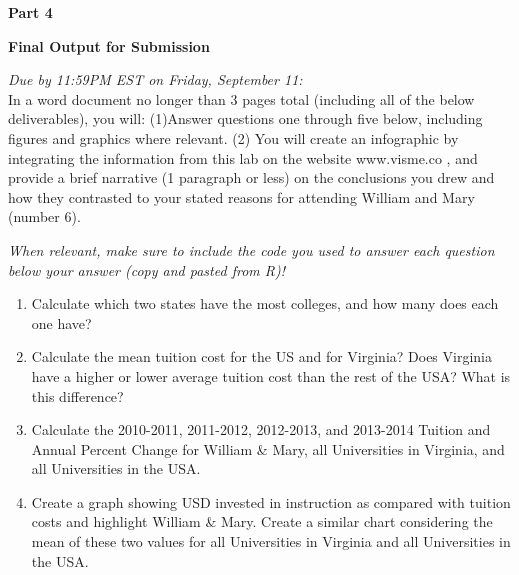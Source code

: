 \documentclass{article}
\newenvironment{Schunk}{}{}
\begin{document}
{\begin{enumerate}[leftmargin=15mm]
\begin{Schunk}
\begin{Sinput}
\end{Sinput}
\end{Schunk}

\end{enumerate}


\setlength{\leftskip}{0cm}
 
\large{\textbf{Part 4}}

\vspace{4mm}
\setlength{\leftskip}{1cm}

\setlength{\leftskip}{0cm}

\large{\textbf{Final Output for Submission}}

\textit{Due by 11:59PM EST on Friday, September 11:}\\

In a word document no longer than 3 pages total (including all of the below deliverables), you will:
(1)Answer questions one through five below, including figures and graphics where relevant. 
(2) You will create an infographic by integrating the information from this lab on the website www.visme.co , and provide a brief narrative (1 paragraph or less) on the conclusions you drew and how they contrasted to your stated reasons for attending William and Mary (number 6).

\textit{When relevant, make sure to include the code you used to answer each question below your answer (copy and pasted from R)!}


\begin{enumerate}[leftmargin=15mm]

\item Calculate which two states have the most colleges, and how many does each one have?

\item Calculate the mean tuition cost for the US and for Virginia?  Does Virginia have a higher or lower average tuition cost than the rest of the USA?  What is this difference?

\item Calculate the 2010-2011, 2011-2012, 2012-2013, and 2013-2014 Tuition and Annual Percent Change for William \& Mary, all Universities in Virginia, and all Universities in the USA.

\item Create a graph showing USD invested in instruction as compared with tuition costs and highlight William \& Mary.  Create a similar chart considering the mean of these two values for all Universities in Virginia and all Universities in the USA.


\end{enumerate}}
\end{document}
